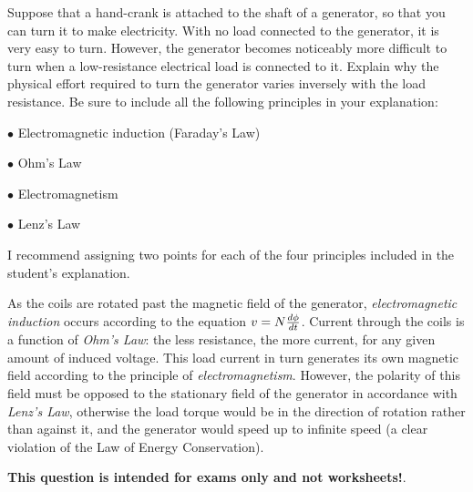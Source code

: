 

Suppose that a hand-crank is attached to the shaft of a generator, so that you can turn it to make electricity.  With no load connected to the generator, it is very easy to turn.  However, the generator becomes noticeably more difficult to turn when a low-resistance electrical load is connected to it.  Explain why the physical effort required to turn the generator varies inversely with the load resistance.  Be sure to include all the following principles in your explanation:

\medskip
\item{$\bullet$} Electromagnetic induction (Faraday's Law)
\item{$\bullet$} Ohm's Law
\item{$\bullet$} Electromagnetism
\item{$\bullet$} Lenz's Law
\medskip

\vskip 50pt







I recommend assigning two points for each of the four principles included in the student's explanation.

\vskip 10pt

As the coils are rotated past the magnetic field of the generator, {\it electromagnetic induction} occurs according to the equation $v = N{d\phi \over dt}$.  Current through the coils is a function of {\it Ohm's Law}: the less resistance, the more current, for any given amount of induced voltage.  This load current in turn generates its own magnetic field according to the principle of {\it electromagnetism}.  However, the polarity of this field must be opposed to the stationary field of the generator in accordance with {\it Lenz's Law}, otherwise the load torque would be in the direction of rotation rather than against it, and the generator would speed up to infinite speed (a clear violation of the Law of Energy Conservation).







{\bf This question is intended for exams only and not worksheets!}.



